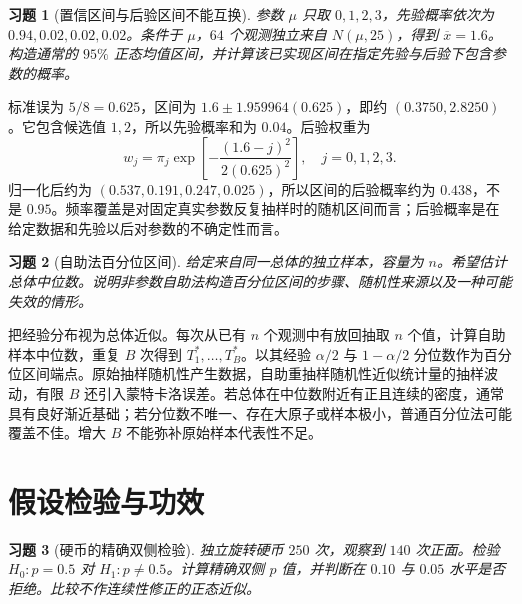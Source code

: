 \documentclass[12pt,fontset=fandol]{ctexart}
\newtheorem{exercise}{习题}[section]
\begin{document}
\begin{exercise}[置信区间与后验区间不能互换]\label{q:M-P10-5}
参数 $\mu$ 只取 $0,1,2,3$，先验概率依次为 $0.94,0.02,0.02,0.02$。条件于 $\mu$，$64$ 个观测独立来自 $N(\mu,25)$，得到 $\overline x=1.6$。构造通常的 $95\%$ 正态均值区间，并计算该已实现区间在指定先验与后验下包含参数的概率。\par{}
\end{exercise}

\begin{solve}\label{a:M-P10-5}标准误为 $5/8=0.625$，区间为 $1.6\pm1.959964(0.625)$，即约 $(0.3750,2.8250)$。它包含候选值 $1,2$，所以先验概率和为 $0.04$。后验权重为\[w_j=\pi_j\exp\left[-\frac{(1.6-j)^2}{2(0.625)^2}\right],\quad j=0,1,2,3.\]归一化后约为 $(0.537,0.191,0.247,0.025)$，所以区间的后验概率约为 $0.438$，不是 $0.95$。频率覆盖是对固定真实参数反复抽样时的随机区间而言；后验概率是在给定数据和先验以后对参数的不确定性而言。\end{solve}

\begin{exercise}[自助法百分位区间]\label{q:B13.6}
给定来自同一总体的独立样本，容量为 $n$。希望估计总体中位数。说明非参数自助法构造百分位区间的步骤、随机性来源以及一种可能失效的情形。\par{}
\end{exercise}

\begin{solve}\label{a:B13.6}把经验分布视为总体近似。每次从已有 $n$ 个观测中有放回抽取 $n$ 个值，计算自助样本中位数，重复 $B$ 次得到 $T_1^*,\ldots,T_B^*$。以其经验 $\alpha/2$ 与 $1-\alpha/2$ 分位数作为百分位区间端点。原始抽样随机性产生数据，自助重抽样随机性近似统计量的抽样波动，有限 $B$ 还引入蒙特卡洛误差。若总体在中位数附近有正且连续的密度，通常具有良好渐近基础；若分位数不唯一、存在大原子或样本极小，普通百分位法可能覆盖不佳。增大 $B$ 不能弥补原始样本代表性不足。\end{solve}

\clearpage\section{假设检验与功效}

\begin{exercise}[硬币的精确双侧检验]\label{q:M-P8-1ab}
独立旋转硬币 $250$ 次，观察到 $140$ 次正面。检验 $H_0:p=0.5$ 对 $H_1:p\ne0.5$。计算精确双侧 $p$ 值，并判断在 $0.10$ 与 $0.05$ 水平是否拒绝。比较不作连续性修正的正态近似。\par{}
\end{exercise}
\end{document}
